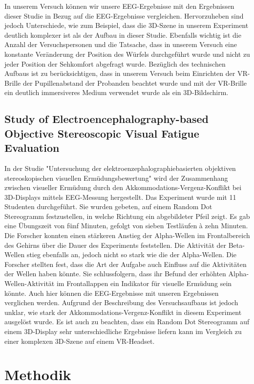\documentclass[conference]{IEEEtran}
\begin{document}
In unserem Versuch können wir unsere EEG-Ergebnisse mit den Ergebnissen dieser Studie in Bezug auf die EEG-Ergebnisse vergleichen. Hervorzuheben sind jedoch Unterschiede, wie zum Beispiel, dass die 3D-Szene in unserem Experiment deutlich komplexer ist als der Aufbau in dieser Studie. Ebenfalls wichtig ist die Anzahl der Versuchspersonen und die Tatsache, dass in unserem Versuch eine konstante Veränderung der Position des Würfels durchgeführt wurde und nicht zu jeder Position der Sehkomfort abgefragt wurde. Bezüglich des technischen Aufbaus ist zu berücksichtigen, dass in unserem Versuch beim Einrichten der VR-Brille der Pupillenabstand der Probanden beachtet wurde und mit der VR-Brille ein deutlich immersiveres Medium verwendet wurde als ein 3D-Bildschirm.


\subsection{Study of Electroencephalography-based Objective Stereoscopic Visual Fatigue Evaluation}
In der Studie "Untersuchung der elektroenzephalographiebasierten objektiven stereoskopischen visuellen Ermüdungsbewertung" \cite{b5} wird der Zusammenhang zwischen visueller Ermüdung durch den Akkommodations-Vergenz-Konflikt bei 3D-Displays mittels EEG-Messung hergestellt.
Das Experiment wurde mit 11 Studenten durchgeführt. Sie wurden gebeten, auf einem Random Dot Stereogramm festzustellen, in welche Richtung ein abgebildeter Pfeil zeigt. Es gab eine Übungszeit von fünf Minuten, gefolgt von sieben Testläufen à zehn Minuten.
Die Forscher konnten einen stärkeren Anstieg der Alpha-Wellen im Frontalbereich des Gehirns über die Dauer des Experiments feststellen. Die Aktivität der Beta-Wellen stieg ebenfalls an, jedoch nicht so stark wie die der Alpha-Wellen. Die Forscher stellten fest, dass die Art der Aufgabe auch Einfluss auf die Aktivitäten der Wellen haben könnte. Sie schlussfolgern, dass ihr Befund der erhöhten Alpha-Wellen-Aktivität im Frontallappen ein Indikator für visuelle Ermüdung sein könnte.
Auch hier können die EEG-Ergebnisse mit unseren Ergebnissen verglichen werden. Aufgrund der Beschreibung des Versuchsaufbaus ist jedoch unklar, wie stark der Akkommodations-Vergenz-Konflikt in diesem Experiment ausgelöst wurde. Es ist auch zu beachten, dass ein Random Dot Stereogramm auf einem 3D-Display sehr unterschiedliche Ergebnisse liefern kann im Vergleich zu einer komplexen 3D-Szene auf einem VR-Headset.
 

\section{Methodik}
\end{document}
